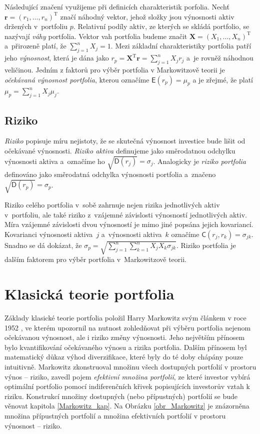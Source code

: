 \documentclass[a4paper,12pt]{report}
\theoremstyle{definition} \newtheorem{definice}[veta]{Definice}
\theoremstyle{remark}
\begin{document}
Následující značení využijeme při definicích charakteristik porfolia.
Nechť $\boldsymbol{r}=(r_1,\dots,r_n)^\mathrm{T}$ značí náhodný vektor, jehož složky jsou výnosnosti aktiv držených v~portfoliu $p$.
Relativní podíly aktiv, ze kterých se skládá portfolio, se nazývají \textit{váhy} portfolia.
Vektor vah portfolia budeme značit $\boldsymbol{X}=(X_1,\dots,X_n)^\mathrm{T}$ a~přirozeně platí, že $\sum_{j=1}^nX_j=1$. 
Mezi základní charakteristiky portfolia patří jeho \textit{výnosnost}, která je dána jako $r_p=\boldsymbol{X}^\mathrm{T}\boldsymbol{r}=\sum_{j=1}^nX_jr_j$ a~je rovněž náhodnou veličinou.   
Jedním z faktorů pro výběr portfolia v Markowitzově teorii je \textit{očekávaná výnosnost portfolia}, kterou označíme $\mathsf{E}(r_p)=\mu_p$ a je zřejmé, že platí $\mu_p=\sum_{j=1}^nX_j\mu_j$.

\subsection{Riziko}
\textit{Riziko} popisuje míru nejistoty, že se skutečná výnosnost investice bude lišit od očekávané výnosnosti.  
\textit{Riziko aktiva} definujeme jako směrodatnou odchylku výnosnosti aktiva a~označíme ho $\sqrt{\mathsf{D}(r_j)}=\sigma_j$.
Analogicky je \textit{riziko portfolia} definováno jako směrodatná odchylka výnosnosti portfolia a~značeno $\sqrt{\mathsf{D}(r_p)}=\sigma_p$.  

Riziko celého portfolia v~sobě zahrnuje nejen rizika jednotlivých aktiv v~portfoliu, ale také riziko z~vzájemné závislosti výnosností jednotlivých aktiv.
Míra vzájemné závislosti dvou výnosností je mimo jiné popsána jejich kovariancí. 
Kovarianci výnosnosti aktiva~$j$ a~výnosnosti aktiva~$k$ označíme $\mathsf{C}(r_j,r_k)=\sigma_{jk}$.
Snadno se dá dokázat, že $\sigma_p=\sqrt{\sum_{j=1}^n\sum_{k=1}^nX_jX_k\sigma_{jk}}$.
Riziko portfolia je dalším faktorem pro výběr portfolia v~Markowitzově teorii.  




\section{Klasická teorie portfolia}\label{KTP}

Základy klasické teorie portfolia položil Harry Markowitz svým článkem v roce 1952 \cite{markowitz}, ve kterém upozornil na nutnost zohledňovat při výběru portfolia nejenom očekávanou výnosnost, ale i riziko změny výnosnosti.
Jeho největším přínosem bylo kvantifikování očekávaného výnosu a rizika portfolia. 
Dalším přínosem byl matematický důkaz výhod diverzifikace, které byly do té doby chápány pouze intuitivně.
Markowitz zkonstruoval množinu všech dostupných portfolií v prostoru výnos -- riziko, zavedl pojem \textit{efektivní množina portfolií}, ze které investor vybírá optimální portfolio pomocí indiferenčních křivek popisujících investorův vztah k riziku.
Konstrukcí množiny dostupných (nebo přípustných) portfolií se bude věnovat kapitola \ref{Markowitz_kap}. 
Na Obrázku \ref{obr_Markowitz} je znázorněna množina přípustných portfolií  a množina efektivních portfolií v prostoru výnosnost -- riziko. 
\end{document}
